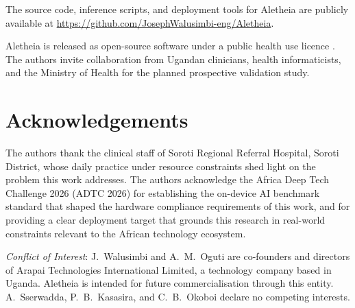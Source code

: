 \documentclass[journal]{IEEEtran}
\begin{document}
The source code, inference scripts, and deployment tools for
Aletheia are publicly available at
\url{https://github.com/JosephWalusimbi-eng/Aletheia}.

Aletheia is released as open-source software under a public
health use licence \cite{aletheia_github}. The authors invite collaboration from Ugandan
clinicians, health informaticists, and the Ministry of Health for
the planned prospective validation study.

\section*{Acknowledgements}

The authors thank the clinical staff of Soroti Regional Referral
Hospital, Soroti District, whose daily practice under resource
constraints shed light on the problem this work addresses. The authors acknowledge the Africa Deep
Tech Challenge 2026 (ADTC 2026) for establishing the on-device
AI benchmark standard that shaped the hardware compliance
requirements of this work, and for providing a clear deployment
target that grounds this research in real-world constraints
relevant to the African technology ecosystem.

\textit{Conflict of Interest}: J.~Walusimbi and A.~M.~Oguti are
co-founders and directors of Arapai Technologies International
Limited, a technology company based in Uganda. Aletheia is
intended for future commercialisation through this entity.
A.~Sserwadda, P.~B.~Kasasira, and C.~B.~Okoboi declare no
competing interests.
\end{document}
